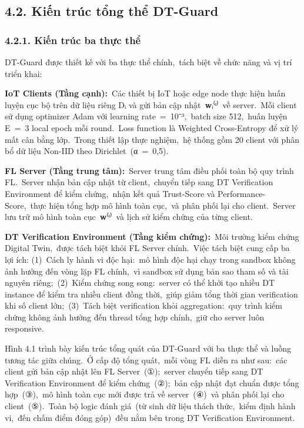 \subsection{4.2. Kiến trúc tổng thể DT-Guard}\label{kiux1ebfn-truxfac-tux1ed5ng-thux1ec3-dt-guard}

\subsubsection{4.2.1. Kiến trúc ba thực thể}\label{kiux1ebfn-truxfac-ba-thux1ef1c-thux1ec3}

DT-Guard được thiết kế với ba thực thể chính,~tách biệt về chức năng và vị trí triển khai:

\textbf{IoT Clients (Tầng cạnh):}~Các thiết bị IoT hoặc edge node thực hiện huấn luyện cục bộ trên dữ liệu riêng Dᵢ và gửi bản cập nhật~\textbf{w}ᵢ⁽ᵗ⁾~về server.~Mỗi client sử dụng optimizer Adam với learning rate~=~10⁻³,~batch size 512,~huấn luyện E~=~3 local epoch mỗi round.~Loss function là Weighted Cross-Entropy để xử lý mất cân bằng lớp.~Trong thiết lập thực nghiệm,~hệ thống gồm 20 client với phân bổ dữ liệu Non-IID theo Dirichlet~(α~=~0,5).

\textbf{FL Server (Tầng trung tâm):}~Server trung tâm điều phối toàn bộ quy trình FL.~Server nhận bản cập nhật từ client,~chuyển tiếp sang DT Verification Environment để kiểm chứng,~nhận kết quả Trust-Score và Performance-Score,~thực hiện tổng hợp mô hình toàn cục,~và phân phối lại cho client.~Server lưu trữ mô hình toàn cục~\textbf{w}⁽ᵗ⁾~và lịch sử kiểm chứng của từng client.

\textbf{DT Verification Environment (Tầng kiểm chứng):}~Môi trường kiểm chứng Digital Twin,~được tách biệt khỏi FL Server chính.~Việc tách biệt cung cấp ba lợi ích: (1)~Cách ly hành vi độc hại:~mô hình độc hại chạy trong sandbox không ảnh hưởng đến vòng lặp FL chính,~vì sandbox sử dụng bản sao tham số và tài nguyên riêng;~(2)~Kiểm chứng song song:~server có thể khởi tạo nhiều DT instance để kiểm tra nhiều client đồng thời,~giúp giảm tổng thời gian verification khi số client lớn;~(3)~Tách biệt verification khỏi aggregation:~quy trình kiểm chứng không ảnh hưởng đến thread tổng hợp chính,~giữ cho server luôn responsive.

Hình 4.1 trình bày kiến trúc tổng quát của DT-Guard với ba thực thể và luồng tương tác giữa chúng.~Ở cấp độ tổng quát,~mỗi vòng FL diễn ra như sau:~các client gửi bản cập nhật lên FL Server~(①);~server chuyển tiếp sang DT Verification Environment để kiểm chứng~(②);~bản cập nhật đạt chuẩn được tổng hợp~(③),~mô hình toàn cục mới được trả về server~(④)~và phân phối lại cho client~(⑤).~Toàn bộ logic đánh giá~(từ sinh dữ liệu thách thức,~kiểm định hành vi,~đến chấm điểm đóng góp)~đều nằm bên trong DT Verification Environment.

